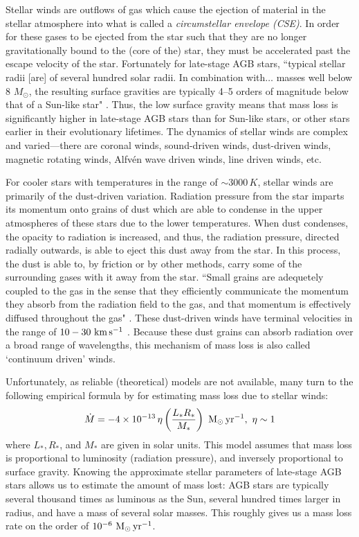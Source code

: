 \documentclass[twocolumn]{aastex63}
\begin{document}
Stellar winds are outflows of gas which cause the ejection of material in the stellar atmosphere into what is called a \textit{circumstellar envelope (CSE)}. In order for these gases to be ejected from the star such that they are no longer gravitationally bound to the (core of the) star, they must be accelerated past the escape velocity of the star. Fortunately for late-stage AGB stars, ``typical stellar radii [are] of several hundred solar radii. In combination with$\ldots$ masses well below 8 $M_\odot$, the resulting surface gravities are typically 4–5 orders of magnitude below that of a Sun-like star" \citep{hofner}. Thus, the low surface gravity means that mass loss is significantly higher in late-stage AGB stars than for Sun-like stars, or other stars earlier in their evolutionary lifetimes. The dynamics of stellar winds are complex and varied—there are coronal winds, sound-driven winds, dust-driven winds, magnetic rotating winds, Alfv\'en wave driven winds, line driven winds, etc. \citep{lamers}

For cooler stars with temperatures in the range of $\sim 3000\,K$, stellar winds are primarily of the dust-driven variation. Radiation pressure from the star imparts its momentum onto grains of dust which are able to condense in the upper atmospheres of these stars due to the lower temperatures. When dust condenses, the opacity to radiation is increased, and thus, the radiation pressure, directed radially outwards, is able to eject this dust away from the star. In this process, the dust is able to, by friction or by other methods, carry some of the surrounding gases with it away from the star. ``Small grains are adequetely coupled to the gas in the sense that they efficiently communicate the momentum they absorb from the radiation field to the gas, and that momentum is effectively diffused throughout the gas" \citep{gilman}. These dust-driven winds have terminal velocities in the range of $10-30~{\rm km\,s^{-1}}$ \citep{lamers}. Because these dust grains can absorb radiation over a broad range of wavelengths, this mechanism of mass loss is also called `continuum driven’ winds. 


Unfortunately, as reliable (theoretical) models are not available, many turn to the following empirical formula by \cite{reimers} for estimating mass loss due to stellar winds:
\begin{equation*}
    \dot M = -4\times 10^{-13}\,\eta \left(\frac{L_*R_*}{M_*}\right)~{\rm M_\odot\,yr^{-1}},~{\rm \eta \sim 1}
\end{equation*}
where $L_*, R_*$, and $M_*$ are given in solar units. This model assumes that mass loss is proportional to luminosity (radiation pressure), and inversely proportional to surface gravity. Knowing the approximate stellar parameters of late-stage AGB stars allows us to estimate the amount of mass lost: AGB stars are typically several thousand times as luminous as the Sun, several hundred times larger in radius, and have a mass of several solar masses. This roughly gives us a mass loss rate on the order of $10^{-6}~{\rm M_\odot\,yr^{-1}}$.
\end{document}
